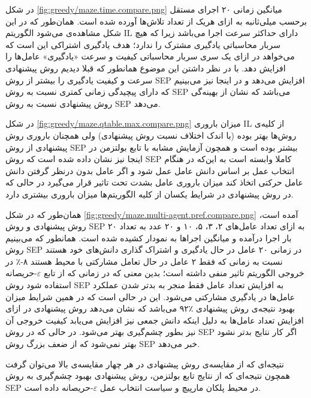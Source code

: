  در شکل
\ref{fig:greedy/maze.time.compare.png}
میانگین زمانی ۲۰ اجرای مستقل برحسب میلی‌ثانبه به ازای هریک از تعداد تلاش‌ها آورده شده است. همان‌طور که در این شکل مشاهده‌ی می‌شود الگوریتم IL دارای حداکثر سرعت اجرا می‌باشد زیرا که هیچ سربار محاسباتی یادگیری مشترک را ندارد؛ هدف یادگیری اشتراکی این است که می‌خواهد در ازای یک سری سربار محاسباتی کیفیت و سرعت «یادگیری» عامل‌ها را افزایش دهد. با در نظر داشتن این موضوع همانطور که قبلا دیدیم روش پیشنهادی سرعت و کیفیت یادگیری را بیشتر از روش SEP افزایش می‌دهد و در اینجا نیز می‌بینیم که دارای پیچیدگی زمانی کمتری نسبت به روش SEP می‌باشد که نشان از بهینه‌گی روش پیشنهادی نسبت به روش SEP می‌دهد.


در شکل
\ref{fig:greedy/maze.qtable.max.compare.png}
میزان باروری IL از کلیه‌ی روش‌ها بهتر بوده (با اندک اختلاف نسبت روش پیشنهادی) ولی همچنان باروری روش پیشنهادی از روش SEP بیشتر بوده است و همچون آزمایش مشابه با تابع بولتزمن در اینجا نیز نشان داده شده است که روش SEP کاملا وابسته است به این‌که در هنگام انتخاب عمل بر اساس دانش عامل عمل شود و اگر عامل بدون درنظر گرفتن دانش عامل حرکتی اتخاذ کند میزان باروری عامل بشدت تحت تاثیر قرار می‌گیرد در حالی که در روش پیشنهادی در شرایط یکسان از کلیه الگوریتم‌ها میزان باروری بیشتری دارد.


 همان‌طور که در شکل
\ref{fig:greedy/maze.multi-agent.pref.compare.png}
آمده است، روش پیشنهادی و روش SEP به ازای تعداد عامل‌های ۲، ۳، ۵، ۱۰ و ۲۰ عدد به تعداد ۲۰ بار اجرا درآمده و میانگین اجراها به نمودار کشیده شده است. همانطور که می‌بینیم روش SEP در زمانی ۲۰ عامل در حال یادگیری و اشتراک گذاری دانش‌های خود هستند نسبت به زمانی که فقط ۲ عامل در حال تعامل مشارکتی با محیط هستند ۸-٪ در خروجی الگوریتم تاثیر منفی داشته است؛ بدین معنی که در زمانی که از تابع $\varepsilon$-حریصانه استفاده شود روش SEP به افزایش تعداد عامل فقط منجر به بدتر شدن عملکرد عامل‌ها در یادگیری مشارکتی می‌شود. این در حالی است که در همین شرایط میزان بهبود نتیجه‌ی روش پیشنهادی ٪۹۲ می‌باشد که نشان می‌دهد روش پیشنهادی در ازای افزایش تعداد عامل‌ها به دلیل اینکه دانش جمعی نیز افزایش می‌یابد کیفیت خروجی آن نیز بطور چشم‌گیری بهتر می‌شود. در حالی که در روش SEP اگر کار نتایج بدتر نشود بهتر نمی‌شود که از ضعف بزرگ روش SEP خبر می‌دهد.


 نتیجه‌ای که از مقایسه‌ی روش پیشنهادی در هر چهار مقایسه‌ی بالا می‌توان گرفت همچون نتیجه‌ای که از نتایج تابع بولتزمن، روش پیشنهادی بهبود چشم‌گیری به روش SEP در محیط پلکان مارپیچ و سیاست انتخاب عمل $\varepsilon$-حریصانه داده است.